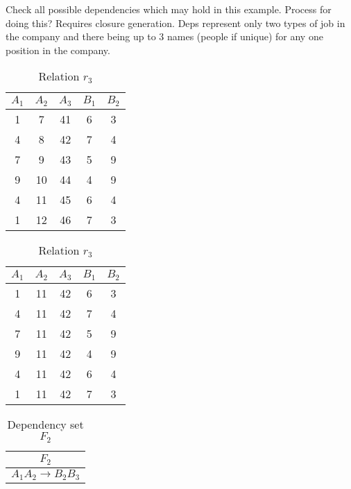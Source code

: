 Check all possible dependencies which may hold in this example.  Process
for doing this?  Requires closure generation.  Deps represent only two types
of job in the company and there being up to 3 names (people if unique) for any
one position in the company. 

{\line
\begin{table}[ht]
\begin{minipage}[b]{16cm}
\begin{center}
\begin{tabular}{|c|c|c|c|c|} \hline
$A_1$ & $A_2$ & $A_3$ & $B_1$ & $B_2$  \\ \hline \hline
1 & 7 & 41 & 6 & 3   \\ 
4 & 8 & 42 & 7 & 4   \\ 
7 & 9 & 43 & 5 & 9   \\ 
9 & 10 & 44 & 4 & 9   \\ 
4 & 11 & 45 & 6 & 4   \\ 
1 & 12 & 46 & 7 & 3   \\ \hline
\end{tabular}
\end{center}
\caption{\label{table:1.4} Relation $r_2$}
\end{minipage}
\hfill
\begin{minipage}[b]{16cm}
\begin{center}
\begin{tabular}{|c|c|c|c|c|} \hline
$A_1$ & $A_2$ & $A_3$ & $B_1$ & $B_2$  \\ \hline \hline
1 & 11 & 42 & 6 & 3   \\ 
4 & 11 & 42 & 7 & 4   \\ 
7 & 11 & 42 & 5 & 9   \\ 
9 & 11 & 42 & 4 & 9   \\ 
4 & 11 & 42 & 6 & 4   \\ 
1 & 11 & 42 & 7 & 3   \\  \hline
\end{tabular}
\end{center}
\caption{\label{table:1.5} Relation $r_3$}
\end{minipage}
\end{table}
}
\medskip

{\line
\begin{table}[ht]
\begin{minipage}[b]{6cm}
\begin{center}
\begin{tabular}{|c|} \hline
{\bf $F_2$}\\ \hline \hline
$A_1A_2 \to B_2B_3$ \\ \hline
\end{tabular}
\end{center}
\caption{\label{table:1.6} Dependency set $F_2$}
\end{minipage}
\end{table}
}
\medskip

